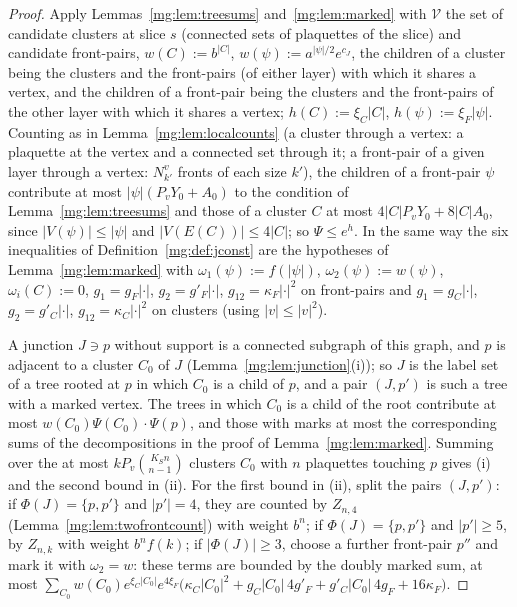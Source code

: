 \documentclass[11pt,a4paper]{article}
\theoremstyle{definition}
\theoremstyle{remark}
\begin{document}
\begin{proof}
Apply Lemmas~\ref{mg:lem:treesums} and~\ref{mg:lem:marked} with $\mathcal V$ the set of candidate clusters at slice $s$ (connected sets of plaquettes of
the slice) and candidate front-pairs, $w(C):=b^{|C|}$, $w(\psi):=a^{|\psi|/2}e^{c_J}$, the children of a cluster being the clusters and the front-pairs
(of either layer) with which it shares a vertex, and the children of a front-pair being the clusters and the front-pairs of the other layer with which
it shares a vertex; $h(C):=\xi_C|C|$, $h(\psi):=\xi_F|\psi|$. Counting as in Lemma~\ref{mg:lem:localcounts} (a cluster through a vertex: a plaquette at
the vertex and a connected set through it; a front-pair of a given layer through a vertex: $N^v_{k'}$ fronts of each size $k'$), the children of a
front-pair $\psi$ contribute at most $|\psi|(P_vY_0+A_0)$ to the condition of Lemma~\ref{mg:lem:treesums} and those of a cluster $C$ at most
$4|C|P_vY_0+8|C|A_0$, since $|V(\psi)|\le|\psi|$ and $|V(E(C))|\le4|C|$; so $\Psi\le e^h$. In the same way the six inequalities of
Definition~\ref{mg:def:jconst} are the hypotheses of Lemma~\ref{mg:lem:marked} with $\omega_1(\psi):=f(|\psi|)$, $\omega_2(\psi):=w(\psi)$,
$\omega_i(C):=0$, $g_1=g_F|\cdot|$, $g_2=g'_F|\cdot|$, $g_{12}=\kappa_F|\cdot|^2$ on front-pairs and $g_1=g_C|\cdot|$, $g_2=g'_C|\cdot|$,
$g_{12}=\kappa_C|\cdot|^2$ on clusters (using $|v|\le|v|^2$).

A junction $J\ni p$ without support is a connected subgraph of this graph, and $p$ is adjacent to a cluster $C_0$ of $J$ (Lemma~\ref{mg:lem:junction}(i));
so $J$ is the label set of a tree rooted at $p$ in which $C_0$ is a child of $p$, and a pair $(J,p')$ is such a tree with a marked vertex. The trees in which
$C_0$ is a child of the root contribute at most $w(C_0)\Psi(C_0)\cdot\Psi(p)$, and those with marks at most the corresponding sums of the
decompositions in the proof of Lemma~\ref{mg:lem:marked}. Summing over the at most $kP_v\binom{K_Sn}{n-1}$ clusters $C_0$ with $n$ plaquettes touching
$p$ gives (i) and the second bound in (ii). For the first bound in (ii), split the pairs $(J,p')$: if $\Phi(J)=\{p,p'\}$ and $|p'|=4$, they are counted by
$Z_{n,4}$ (Lemma~\ref{mg:lem:twofrontcount}) with weight $b^n$; if $\Phi(J)=\{p,p'\}$ and $|p'|\ge5$, by $Z_{n,k}$ with weight $b^nf(k)$; if $|\Phi(J)|\ge3$,
choose a further front-pair $p''$ and mark it with $\omega_2=w$: these terms are bounded by the doubly marked sum, at most
$\sum_{C_0}w(C_0)e^{\xi_C|C_0|}e^{4\xi_F}\bigl(\kappa_C|C_0|^2+g_C|C_0|\,4g'_F+g'_C|C_0|\,4g_F+16\kappa_F\bigr)$.
\end{proof}
\end{document}
